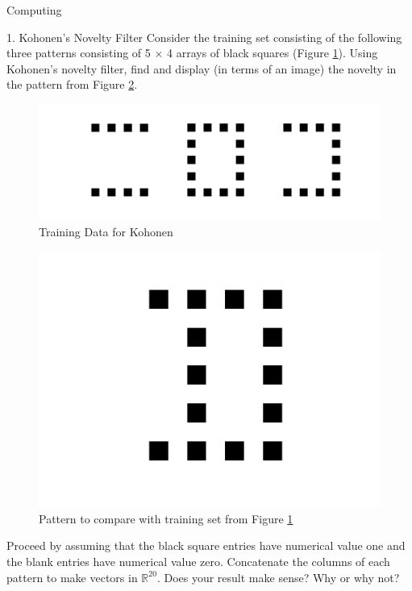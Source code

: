 \begin{section}{Computing}

\begin{homeworkSection}{1. Kohonen's Novelty Filter }
Consider the training set consisting of the following three patterns consisting of 5 $\times$ 4 arrays of black squares (Figure \ref{fig:training}). Using Kohonen's novelty filter, find and display (in terms of an image) the novelty in the pattern from Figure \ref{fig:pattern}.

\begin{figure}[H]
\centering
\includegraphics[width=0.75\columnwidth]{../data/kohonen_training}
\caption{Training Data for Kohonen}
\label{fig:training}
\end{figure}


\begin{figure}[H]
\centering
\includegraphics[width=0.35\columnwidth]{../data/pattern}
\caption{Pattern to compare with training set from Figure \ref{fig:training}}
\label{fig:pattern}
\end{figure}

Proceed by assuming that the black square entries have numerical value one and the blank entries have numerical value zero. Concatenate the columns of each pattern to make vectors in $\mathbb{R}^{20}$. Does your result make sense? Why or why not?


\end{homeworkSection}
\end{section}
